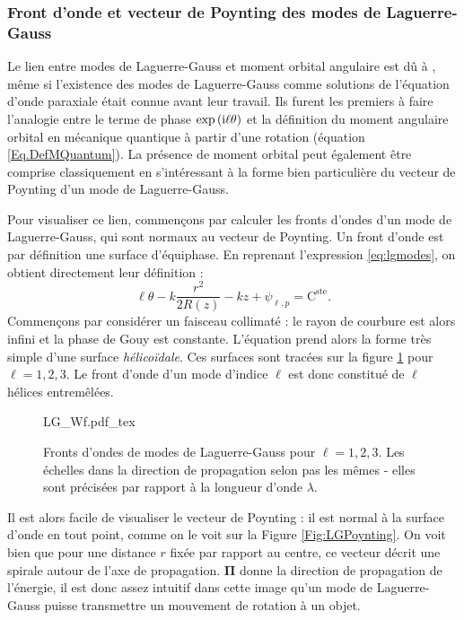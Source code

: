 \subsubsection{Front d'onde et vecteur de Poynting des modes de Laguerre-Gauss}
Le lien entre modes de Laguerre-Gauss et moment orbital angulaire est dû à , même si l'existence des modes de Laguerre-Gauss comme solutions de l'équation d'onde paraxiale était connue avant leur travail. Ils furent les premiers à faire l'analogie entre le terme de phase $\exp{({\mathrm{i}}\ell \theta )}$ et la définition du moment angulaire orbital en mécanique quantique à partir d'une rotation (équation \ref{Eq.DefMQuantum}). La présence de moment orbital peut également être comprise classiquement en s'intéressant à la forme bien particulière du vecteur de Poynting d'un mode de Laguerre-Gauss.\par
Pour visualiser ce lien, commençons par calculer les fronts d'ondes d'un mode de Laguerre-Gauss, qui sont normaux au vecteur de Poynting.
Un front d'onde est par définition une surface d'équiphase. En reprenant l'expression \ref{eq:lgmodes}, on obtient directement leur définition :
\begin{equation*}
\ell\theta-k\frac{r^2}{2R(z)}-kz+\psi _{\ell ,p} = \mathrm{C}^\mathrm{ste}.
\end{equation*}
Commençons par considérer un faisceau collimaté : le rayon de courbure est alors infini et la phase de Gouy est constante. L'équation prend alors la forme très simple d'une surface \textit{hélicoïdale}. Ces surfaces sont tracées sur la figure \ref{Fig:LGwf} pour $\ell = 1,2,3$. Le front d'onde d'un mode d'indice $\ell$ est donc constitué de $\ell$ hélices entremêlées.
\begin{figure}[!ht]
\centering
\def\svgwidth{\columnwidth}
{LG_Wf.pdf_tex}
\caption{Fronts d'ondes de modes de Laguerre-Gauss pour $\ell=1,2,3$. Les échelles dans la direction de propagation selon pas les mêmes - elles sont précisées par rapport à la longueur d'onde $\lambda$.}
\label{Fig:LGwf}
\end{figure}

Il est alors facile de visualiser le vecteur de Poynting : il est normal à la surface d'onde en tout point, comme on le voit sur la Figure \ref{Fig:LGPoynting}. On voit bien que pour une distance $r$ fixée par rapport au centre, ce vecteur décrit une spirale autour de l'axe de propagation. $\bm{\Pi}$ donne la direction de propagation de l'énergie, il est donc assez intuitif dans cette image qu'un mode de Laguerre-Gauss puisse transmettre un mouvement de rotation à un objet.

